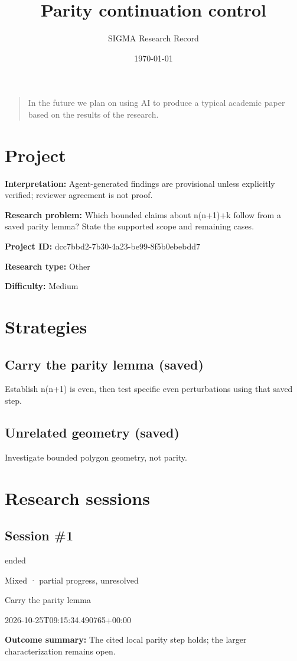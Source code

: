 \documentclass[11pt]{article}
\title{Parity continuation control}
\author{SIGMA Research Record}
\date{\today}
\begin{document}
\maketitle
\begin{quote}\small In the future we plan on using AI to produce a typical academic paper based on the results of the research.\end{quote}
\section{Project}
\textbf{Interpretation:} Agent-generated findings are provisional unless explicitly verified; reviewer agreement is not proof.\par
\textbf{Research problem:} Which bounded claims about n(n+1)+k follow from a saved parity lemma? State the supported scope and remaining cases.\par
\textbf{Project ID:} dcc7bbd2-7b30-4a23-be99-8f5b0ebebdd7\par
\textbf{Research type:} Other\par
\textbf{Difficulty:} Medium\par
\section{Strategies}
\subsection{Carry the parity lemma (saved)}
Establish n(n+1) is even, then test specific even perturbations using that saved step.\par
\subsection{Unrelated geometry (saved)}
Investigate bounded polygon geometry, not parity.\par
\section{Research sessions}
\subsection{Session \#1}
\begin{description}[style=nextline,font=\normalfont\bfseries,leftmargin=0pt,labelsep=0pt]
\item[Execution status] ended
\item[Outcome] Mixed · partial progress, unresolved
\item[Strategy] Carry the parity lemma
\item[Started] 2026-10-25T09:15:34.490765+00:00
\end{description}
\textbf{Outcome summary:} The cited local parity step holds; the larger characterization remains open.\par
\end{document}
